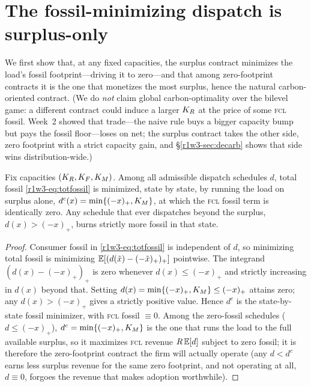 \section{The fossil-minimizing dispatch is surplus-only}\label{r1w3-sec:optcontract}

We first show that, at any fixed capacities, the surplus contract minimizes the load's
fossil footprint---driving it to zero---and that among zero-footprint contracts it is
the one that monetizes the most surplus, hence the natural carbon-oriented contract.
(We do \emph{not} claim global carbon-optimality over the bilevel game: a different
contract could induce a larger $K_R$ at the price of some \textsc{fcl} fossil. Week~2
showed that trade---the naive rule buys a bigger capacity bump but pays the fossil
floor---loses on net; the surplus contract takes the other side, zero footprint with a
strict capacity gain, and \S\ref{r1w3-sec:decarb} shows that side wins distribution-wide.)

\begin{proposition}\label{r1w3-prop:surplusopt}
Fix capacities $(K_R,K_F,K_M)$. Among all admissible dispatch schedules $d$, total
fossil \eqref{r1w3-eq:totfossil} is minimized, state by state, by running the load on
surplus alone, $d^{c}(x)=\min\{(-x)_+,K_M\}$, at which the \textsc{fcl} fossil term is
identically zero. Any schedule that ever dispatches beyond the surplus,
$d(x)>(-x)_+$, burns strictly more fossil in that state.
\end{proposition}

\begin{proof}
Consumer fossil in \eqref{r1w3-eq:totfossil} is independent of $d$, so minimizing total
fossil is minimizing $\mathbb{E}[(d(\tilde x)-(-\tilde x)_+)_+]$ pointwise. The integrand
$(d(x)-(-x)_+)_+$ is zero whenever $d(x)\le(-x)_+$ and strictly increasing in $d(x)$
beyond that. Setting $d(x)=\min\{(-x)_+,K_M\}\le(-x)_+$ attains zero; any
$d(x)>(-x)_+$ gives a strictly positive value. Hence $d^{c}$ is the state-by-state
fossil minimizer, with \textsc{fcl} fossil $\equiv0$. Among the zero-fossil schedules
($d\le(-x)_+$), $d^{c}=\min\{(-x)_+,K_M\}$ is the one that runs the load to the full
available surplus, so it maximizes \textsc{fcl} revenue $R\,\mathbb{E}[d]$ subject to zero
fossil; it is therefore the zero-footprint contract the firm will actually operate
(any $d<d^{c}$ earns less surplus revenue for the same zero footprint, and not
operating at all, $d\equiv0$, forgoes the revenue that makes adoption worthwhile).
\end{proof}

